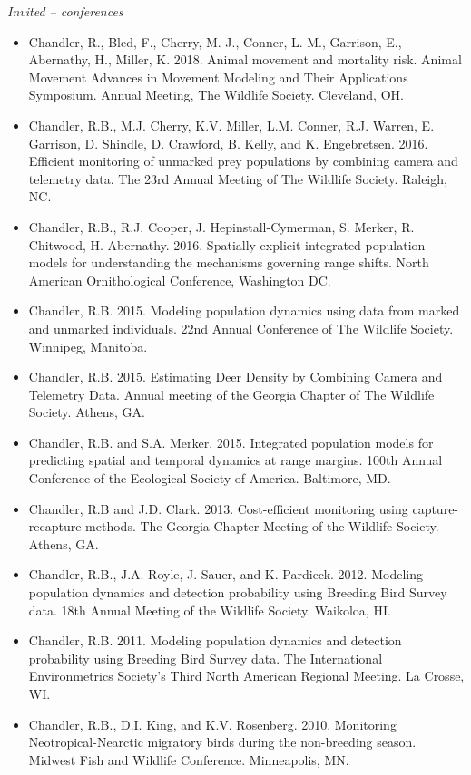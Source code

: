 \emph{Invited -- conferences}

\begin{itemize}

\item Chandler, R., Bled, F., Cherry, M. J., Conner, L. M., Garrison,
  E., Abernathy, H., Miller, K. 2018. Animal movement and mortality
  risk. Animal Movement Advances in Movement Modeling and Their
  Applications Symposium. Annual Meeting, The Wildlife
  Society. Cleveland, OH. 
  
\item Chandler, R.B., M.J. Cherry, K.V. Miller, L.M. Conner,
  R.J. Warren, E. Garrison, D. Shindle, D. Crawford, B. Kelly, and K. 
  Engebretsen. 2016. Efficient monitoring of unmarked prey populations
  by combining camera and telemetry data. The 23rd Annual Meeting of
  The Wildlife Society. Raleigh, NC.

\item Chandler, R.B., R.J. Cooper, J. Hepinstall-Cymerman, S. Merker, R.
  Chitwood, H. Abernathy. 2016. Spatially explicit integrated
  population models for understanding the mechanisms governing range
  shifts. North American Ornithological Conference, Washington DC. 

\item Chandler, R.B. 2015. Modeling population dynamics using data
  from marked and unmarked individuals. 22nd Annual Conference of The
  Wildlife Society. Winnipeg, Manitoba.

\item Chandler, R.B. 2015. Estimating Deer Density by Combining Camera
  and Telemetry Data. Annual meeting of the Georgia Chapter of The
  Wildlife Society. Athens, GA.

\item Chandler, R.B. and S.A. Merker. 2015. Integrated population
  models for predicting spatial and temporal dynamics at range
  margins. 100th Annual Conference of the Ecological Society of
  America. Baltimore, MD. 

\item Chandler, R.B and J.D. Clark. 2013. Cost-efficient monitoring
  using capture-recapture methods. The Georgia Chapter Meeting of the
  Wildlife Society. Athens, GA.

\item Chandler, R.B., J.A. Royle, J. Sauer, and
  K. Pardieck. 2012. Modeling population dynamics and detection
  probability using Breeding Bird Survey data. 18th Annual Meeting of
  the Wildlife Society. Waikoloa, HI.

\item Chandler, R.B. 2011. Modeling population dynamics and detection
  probability using Breeding Bird Survey data. The International
  Environmetrics Society's Third North
  American Regional Meeting. La Crosse, WI.

\item Chandler, R.B., D.I. King, and K.V. Rosenberg. 2010. Monitoring
  Neotropical-Nearctic migratory birds during the non-breeding
  season. Midwest Fish and Wildlife Conference. Minneapolis, MN.

\end{itemize}

